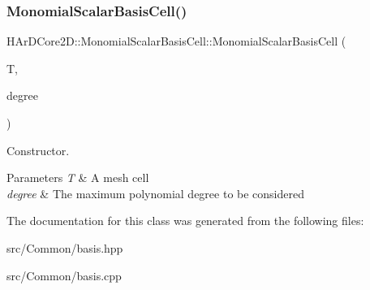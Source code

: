 \subsubsection{\texorpdfstring{Monomial\+Scalar\+Basis\+Cell()}{MonomialScalarBasisCell()}}
{\footnotesize\ttfamily H\+Ar\+D\+Core2\+D\+::\+Monomial\+Scalar\+Basis\+Cell\+::\+Monomial\+Scalar\+Basis\+Cell (\begin{DoxyParamCaption}\item[{const \hyperlink{classHArDCore2D_1_1Cell}{Cell} \&}]{T,  }\item[{size\+\_\+t}]{degree }\end{DoxyParamCaption})}



Constructor. 


\begin{DoxyParams}{Parameters}
{\em T} & A mesh cell \\
\hline
{\em degree} & The maximum polynomial degree to be considered \\
\hline
\end{DoxyParams}


The documentation for this class was generated from the following files\+:\begin{DoxyCompactItemize}
\item 
src/\+Common/basis.\+hpp\item 
src/\+Common/basis.\+cpp\end{DoxyCompactItemize}
